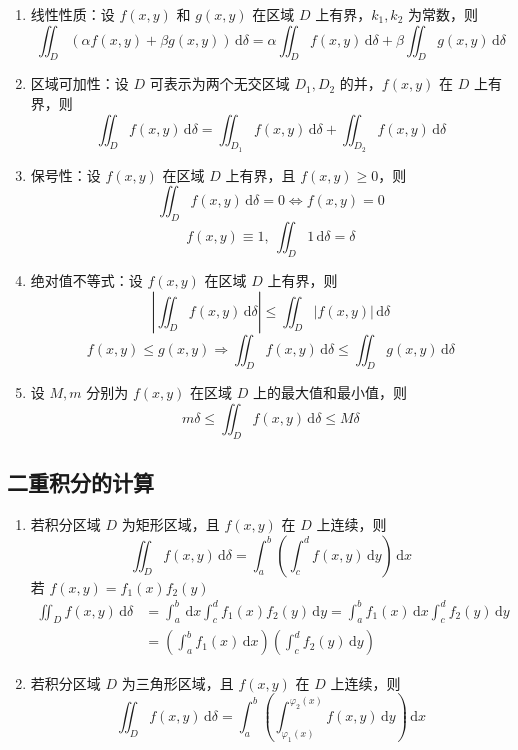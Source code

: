 \begin{enumerate}
    \item 线性性质：设 $f(x,y)$ 和 $g(x,y)$ 在区域 $D$ 上有界，$k_{1},k_{2}$ 为常数，则
          \[
              \iint_{D} (\alpha f(x,y) + \beta g(x,y)) \, \mathrm{d}\delta = \alpha \iint_{D} f(x,y) \, \mathrm{d}\delta + \beta \iint_{D} g(x,y) \, \mathrm{d}\delta
          \]
    \item 区域可加性：设 $D$ 可表示为两个无交区域 $D_{1},D_{2}$ 的并，$f(x,y)$ 在 $D$ 上有界，则
          \[
              \iint_{D} f(x,y) \, \mathrm{d}\delta = \iint_{D_{1}} f(x,y) \, \mathrm{d}\delta + \iint_{D_{2}} f(x,y) \, \mathrm{d}\delta
          \]
    \item 保号性：设 $f(x,y)$ 在区域 $D$ 上有界，且 $f(x,y) \geq 0$，则
          \[
              \iint_{D} f(x,y) \, \mathrm{d}\delta = 0 \iff f(x,y) = 0
          \]
          \[
              f(x,y)\equiv1,\ \iint_{D} 1 \, \mathrm{d}\delta = \delta
          \]
    \item 绝对值不等式：设 $f(x,y)$ 在区域 $D$ 上有界，则
          \[
              \left| \iint_{D} f(x,y) \, \mathrm{d}\delta \right| \leq \iint_{D} |f(x,y)| \, \mathrm{d}\delta
          \]
          \[
              f(x,y)\le g(x,y)\Rightarrow \iint_{D}f(x,y) \, \mathrm{d}\delta\le\iint_{D}g(x,y) \, \mathrm{d}\delta
          \]
    \item 设 $M,m$ 分别为 $f(x,y)$ 在区域 $D$ 上的最大值和最小值，则
          \[
              m\delta\le\iint_{D}f(x,y) \, \mathrm{d}\delta\le M\delta
          \]

\end{enumerate}

\subsection{二重积分的计算}

\begin{enumerate}
    \item 若积分区域 $D$ 为矩形区域，且 $f(x,y)$ 在 $D$ 上连续，则
          \[
              \iint_{D} f(x,y) \, \mathrm{d}\delta = \int_{a}^{b} \left( \int_{c}^{d} f(x,y) \, \mathrm{d}y \right) \, \mathrm{d}x
          \]
          若 $f(x,y) = f_1(x)f_2(y)$
          \[\begin{aligned}
                  \iint_{D} f(x,y) \, \mathrm{d}\delta & = \int_{a}^{b} \, \mathrm{d}x \int_{c}^{d} f_1(x)f_2(y) \, \mathrm{d}y = \int_{a}^{b} f_1(x) \, \mathrm{d}x \int_{c}^{d} f_2(y) \, \mathrm{d}y \\
                                                       & = \left( \int_{a}^{b} f_1(x) \, \mathrm{d}x \right) \left( \int_{c}^{d} f_2(y) \, \mathrm{d}y \right)
              \end{aligned}\]
    \item 若积分区域 $D$ 为三角形区域，且 $f(x,y)$ 在 $D$ 上连续，则
          \[
              \iint_{D} f(x,y) \, \mathrm{d}\delta = \int_{a}^{b} \left( \int_{\varphi_{1}(x)}^{\varphi_{2}(x)} f(x,y) \, \mathrm{d}y \right) \, \mathrm{d}x
          \]
\end{enumerate}